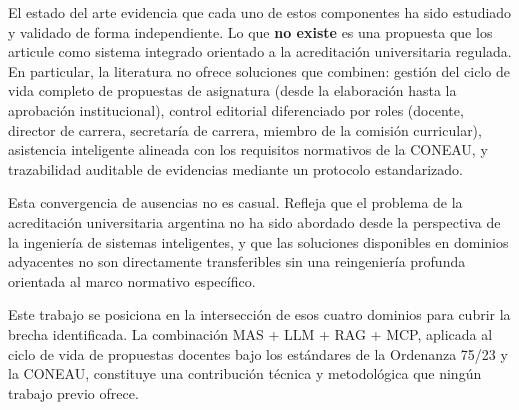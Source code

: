 El estado del arte evidencia que cada uno de estos componentes ha sido estudiado y validado de forma independiente. Lo que \textbf{no existe} es una propuesta que los articule como sistema integrado orientado a la acreditación universitaria regulada. En particular, la literatura no ofrece soluciones que combinen: gestión del ciclo de vida completo de propuestas de asignatura (desde la elaboración hasta la aprobación institucional), control editorial diferenciado por roles (docente, director de carrera, secretaría de carrera, miembro de la comisión curricular), asistencia inteligente alineada con los requisitos normativos de la CONEAU, y trazabilidad auditable de evidencias mediante un protocolo estandarizado.

Esta convergencia de ausencias no es casual. Refleja que el problema de la acreditación universitaria argentina no ha sido abordado desde la perspectiva de la ingeniería de sistemas inteligentes, y que las soluciones disponibles en dominios adyacentes no son directamente transferibles sin una reingeniería profunda orientada al marco normativo específico.

Este trabajo se posiciona en la intersección de esos cuatro dominios para cubrir la brecha identificada. La combinación MAS + LLM + RAG + MCP, aplicada al ciclo de vida de propuestas docentes bajo los estándares de la Ordenanza 75/23 y la CONEAU, constituye una contribución técnica y metodológica que ningún trabajo previo ofrece. 

